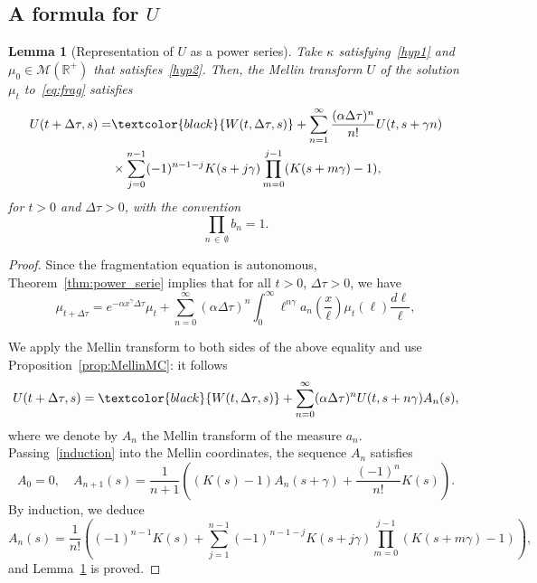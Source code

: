 \documentclass[10pt]{amsart}
\newtheorem{lemm}[theo]{Lemma}\newtheorem{prop}[theo]{Proposition}\newtheorem{coro}[theo]{Corollary}\newtheorem{conj}[theo]{Conjecture}
\theoremstyle{definition}\newtheorem{defi}[theo]{Definition}\newtheorem{rema}[theo]{Remark}\newtheorem{exam}[theo]{Example}\newtheorem{exem}[theo]{Example}\newtheorem{nota}[theo]{Notation}
\newcommand*\dst{\displaystyle}
\renewcommand*\a{\alpha}
\newcommand*\R{\mathbb{R}}
\newcommand*\M{\mathcal{M}}
\newcommand{\Mag}[1]{\textcolor{black}{#1}}
\begin{document}
\subsection{A formula for \texorpdfstring{$U$}{U}}
\begin{lemm}[Representation of $U$ as a power series]\label{lemma:MellinPS}
Take $\kappa$ satisfying~\eqref{hyp1} and $\mu_0\in \M(\R^+)$
that satisfies~\eqref{hyp2}. Then, the Mellin transform $U$ of the solution $\mu_t$ to~\eqref{eq:frag} satisfies
\begin{equation}\label{U_power_serie_inter}
\begin{aligned}
U(t+\Delta \tau, s) =&
\Mag{W(t,\Delta \tau, s) } + \sum_{n=1}^{\infty} \dfrac{(\a \Delta \tau)^n}{n!}U(t,s+\gamma n)\\
&\times \sum_{j=0}^{n-1}(-1)^{n-1-j}K(s+j\gamma)
\prod_{m=0}^{j-1} (K(s+m\gamma)-1),
\end{aligned}
\end{equation}
for $t>0$ and $\Delta \tau >0$, with the convention
\begin{equation*}
\prod_{n\,\in\,\emptyset} b_n=1.
\end{equation*}
\end{lemm}

\begin{proof}
Since the fragmentation equation is autonomous, Theorem~\ref{thm:power_serie} implies that for all $t>0$, $\Delta \tau >0$, we have
\begin{equation*}
\mu_{t+\Delta \tau }= e^{-\a x^{\gamma}\Delta \tau } \mu_t + \sum_{n=0}^{\infty} (\a \Delta \tau)^n
\dst\int_0^{\infty} \ell^{n\gamma}a_n\left(\dfrac{x}{\ell}\right)\mu_t(\ell) \dfrac{d\ell}\ell{},
\end{equation*}


We apply the Mellin transform to both sides of the above equality and use Proposition~\ref{prop:MellinMC}: it follows
\begin{equation*}
U(t+\Delta \tau,s) = \Mag{W(t,\Delta \tau, s) } + \sum_{n=0}^{\infty}(\a\Delta \tau)^n U(t,s+n\gamma)A_n(s),
\end{equation*}
where we denote by $A_n$ the Mellin transform of the measure $a_n$. Passing~\eqref{induction} into the Mellin coordinates, the sequence $A_n$ satisfies
\begin{equation*}
A_0=0, \quad A_{n+1}(s) = \dfrac{1}{n+1} \left((K(s)-1) A_n(s+\gamma) +\dfrac{(-1)^n}{n!}K(s) \right).
\end{equation*}
By induction, we deduce
\begin{equation*}
A_n(s) = \dfrac{1}{n!}\left((-1)^{n-1}K(s) + \sum_{j=1}^{n-1}(-1)^{n-1-j}K(s+j\gamma)
\prod_{m=0}^{j-1} (K(s+m\gamma)-1) \right),
\end{equation*}
and Lemma~\ref{lemma:MellinPS} is proved.
\end{proof}
\end{document}
